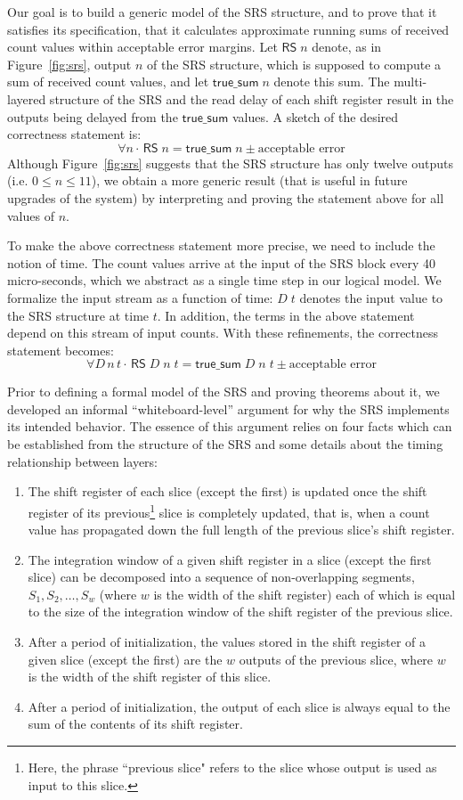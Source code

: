 \documentclass{llncs}
\begin{document}
Our goal is to build a generic model of the SRS structure, and to prove that it satisfies its specification, that it calculates approximate running sums of received count values within acceptable error margins.
Let $\mathsf{RS}\;n$ denote, as in Figure~\ref{fig:srs}, output $n$ of the SRS structure, which is supposed to compute a sum of received count values, and let $\mathsf{true\_sum}\;n$ denote this sum.
The multi-layered structure of the SRS and the read delay of each shift register result in the outputs being delayed from the $\mathsf{true\_sum}$ values.
A sketch of the desired correctness statement is: \[\forall{n} \cdot \, \mathsf{RS}\;n= \mathsf{true\_sum}\; n \pm\text{acceptable error}\]
Although Figure~\ref{fig:srs} suggests that the SRS structure has only twelve outputs  (i.e. $0\leq{n}\leq11$), we obtain a more generic result (that is useful in future upgrades of the system) by interpreting and proving the statement above for all values of $n$.

To make the above correctness statement more precise, we need to include the notion of time.
The count values arrive at the input of the SRS block every 40 micro-seconds, which we abstract as a single time step in our logical model.
We formalize the input stream as a function of time: $D\;t$ denotes the input value to the SRS structure at time $t$.
In addition, the terms in the above statement depend on this stream of input counts.
With these refinements, the correctness statement becomes: \[\forall{D\,n\,t} \cdot \,\mathsf{RS}\;D\;n\;t = \mathsf{true\_sum}\;D\;n\;t\pm\text{acceptable error}\]

Prior to defining a formal model of the SRS and proving theorems about it, we developed an informal ``whiteboard-level'' argument for why the SRS implements its intended behavior.
The essence of this argument relies on four facts which can be established from the structure of the SRS and some details about the timing relationship between layers:
\begin{enumerate}
\item The shift register of each slice (except the first) is updated once the shift register of its previous\footnote{Here, the phrase ``previous slice" refers to the slice whose output is used as input to this slice.} slice is completely updated, that is, when a count value has propagated down the full length of the previous slice's shift register.
\item The integration window of a given shift register in a slice (except the first slice) can be decomposed into a sequence of non-overlapping segments, $S_1, S_2, \ldots, S_w$ (where $w$ is the width of the shift register) each of which is equal to the size of the integration window of the shift register of the previous slice.
\item After a period of initialization, the values stored in the shift register of a given slice (except the first) are the $w$ outputs of the previous slice, where $w$ is the width of the shift register of this slice.
\item After a period of initialization, the output of each slice is always equal to the sum of the contents of its shift register.
\end{enumerate}
\end{document}
